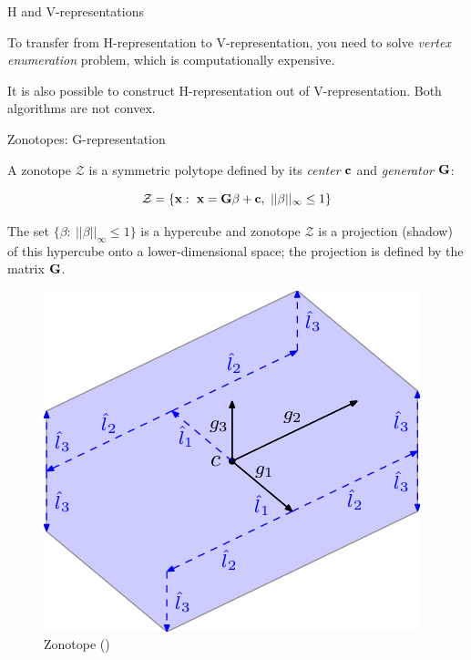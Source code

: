 \documentclass{beamer}
\begin{document}
\begin{frame}{H and V-representations}
\begin{flushleft}

To transfer from H-representation to V-representation, you need to solve \emph{vertex enumeration} problem, which is computationally expensive. 

\bigskip

It is also possible to construct H-representation out of V-representation.  Both algorithms are not convex.
 
\end{flushleft}
\end{frame}




\begin{frame}{Zonotopes: G-representation}
	\begin{flushleft}
		
		A zonotope $\mathcal{Z}$ is a symmetric polytope defined by its \emph{center} $\mathbf{c}$ and \emph{generator} $\mathbf{G}$:
		
		\begin{equation}
			\mathcal{Z} = \{ \bo{x}: \ \bo{x}=\bo{G}\beta+\bo{c}, \ ||\beta||_\infty \leq 1  \}
		\end{equation}
	
		The set $\{ \beta: \ ||\beta||_\infty \leq 1  \}$ is a hypercube and zonotope $\mathcal{Z}$ is a projection (shadow) of this hypercube onto a lower-dimensional space; the projection is defined by the matrix $\mathbf{G}$.
		
		\begin{figure}
			\centering
			\includegraphics[width=0.4\linewidth]{zonotope_example}
			\caption{Zonotope () }
			\label{fig:zonotopeexample}
		\end{figure}
		
		
	\end{flushleft}
\end{frame}
\end{document}
